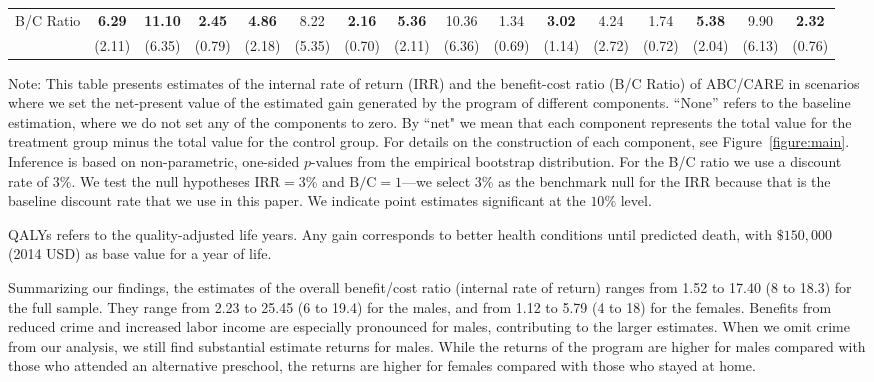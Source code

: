 \begin{table}
\begin{threeparttable}
\begin{tabular}{lccc|ccc|ccc|ccc|ccc}
B/C Ratio & \textbf{6.29} & \textbf{11.10} & \textbf{2.45} & 	\textbf{4.86} & 8.22  & \textbf{2.16} & \textbf{5.36} & 10.36 &  1.34 &  	\textbf{3.02} & 4.24 & 1.74  & 		\textbf{5.38} & 9.90 & \textbf{2.32} \\
                 & (2.11) & (6.35) & (0.79) & 				(2.18) & (5.35) & (0.70) & 			(2.11) &  (6.36) &  (0.69) & 			(1.14) & (2.72) & (0.72)   & 	(2.04) & (6.13) & (0.76)  \\ \bottomrule
\end{tabular}
\begin{tablenotes}
\footnotesize
\item Note: This table presents estimates of the internal rate of return (IRR) and the benefit-cost ratio (B/C Ratio) of ABC/CARE in scenarios where we set the net-present value of the estimated gain generated by the program of different components. ``None'' refers to the baseline estimation, where we do not set any of the components to zero. By ``net" we mean that each component represents the total value for the treatment group minus the total value for the control group. For details on the construction of each component, see Figure~\ref{figure:main}. Inference is based on non-parametric, one-sided $p$-values from the empirical bootstrap distribution. For the B/C ratio we use a discount rate of $3\%$. We test the null hypotheses $\text{IRR} = 3\%$ and $\text{B/C} = 1$---we select $3\%$ as the benchmark null for the IRR because that is the baseline discount rate that we use in this paper. We indicate point estimates significant at the $10\%$ level. \\
\item *QALYs refers to the quality-adjusted life years. Any gain corresponds to better health conditions until predicted death, with $\$150,000$ (2014 USD) as base value for a year of life.\\
\end{tablenotes}
\end{threeparttable}
\end{table}

Summarizing our findings, the estimates of the overall benefit/cost ratio (internal rate of return) ranges from 1.52 to 17.40 (8 to 18.3) for the full sample. They range from 2.23 to 25.45 (6 to 19.4) for the males, and from 1.12 to 5.79 (4 to 18) for the females. Benefits from reduced crime and increased labor income are especially pronounced for males, contributing to the larger estimates. When we omit crime from our analysis, we still find substantial estimate returns for males. While the returns of the program are higher for males compared with those who attended an alternative preschool, the returns are higher for females compared with those who stayed at home.

